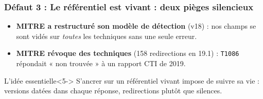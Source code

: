 \documentclass[aspectratio=169,11pt]{beamer}
\begin{document}
\begin{frame}
  \frametitle{Défaut 3 : Le référentiel est vivant : deux pièges silencieux}
  \vspace{0.1cm}
  \begin{itemize}\setlength\itemsep{0.5em}
    \item \textbf{MITRE a restructuré son modèle de détection} (v18) : nos
      champs se sont vidés sur \emph{toutes} les techniques sans une seule
      erreur. 
    \item<3-> \textbf{MITRE révoque des techniques} (158 redirections en 19.1) :
      \texttt{T1086} répondait « non trouvée » à un rapport CTI de 2019.
  \end{itemize}
  \vspace{0.25cm}
  \begin{block}{L'idée essentielle}<5->
    S'ancrer sur un référentiel vivant impose de suivre sa vie :
    versions datées dans chaque réponse, redirections plutôt que silences.
  \end{block}
\end{frame}
 
\end{document}
